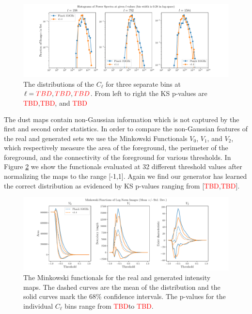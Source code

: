 \documentclass[twocolumn]{aastex62}
\def\tbd{\textcolor{red}{TBD}}
\begin{document}
\begin{figure}[!tbh]
\includegraphics[width = \textwidth]{HistPowerSpectraSlices.pdf}
\caption{The distributions of the $C_{\ell}$ for three separate bins at $\ell=\tbd,\tbd,\tbd$. From left to right the KS p-values are \tbd,\tbd, and \tbd}
\label{fig:powerhist}
\end{figure}

The dust maps contain non-Gaussian information which is not captured by the first and second order statistics. In order to compare the non-Gaussian features of the real and generated sets we use the Minkowski Functionals $V_0$, $V_1$, and $V_2$, which respectively measure the area of the foreground, the perimeter of the foreground, and the connectivity of the foreground for various thresholds.  In Figure \ref{fig:mink} we show the functionals evaluated at 32 different threshold values after normalizing the maps to the range [-1,1]. Again we find our generator has learned the correct distribution as evidenced by KS p-values ranging from [\tbd,\tbd]. 

\begin{figure}[!tbh]
\includegraphics[width = \textwidth]{MinkowskiFunctionals.pdf}
\caption{The Minkowski functionals for the real and generated intensity maps. The dashed curves are the mean of the distribution and the solid curves mark the 68\% confidence intervals. The p-values for the individual $C_{\ell}$ bins range from \tbd to \tbd.}
\label{fig:mink}
\end{figure}
\end{document}
